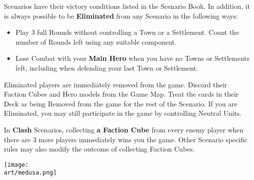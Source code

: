 
\begin{multicols*}{2}

 Scenarios have their victory conditions listed in the Scenario Book.
In addition, it is always possible to be \textbf{Eliminated} from any Scenario in the following ways:
\begin{itemize}
  \item Play 3 full Rounds without controlling a Town or a Settlement.
    Count the number of Rounds left using any suitable component.
  \item Lose Combat with your \textbf{Main Hero} when you have no Towns or Settlements left, including when defending your last Town or Settlement.
\end{itemize}
Eliminated players are immediately removed from the game.
Discard their Faction Cubes and Hero models from the Game Map.
Treat the cards in their Deck as being Removed from the game for the rest of the Scenario.
If you are Eliminated, you may still participate in the game by controlling Neutral Units.\par
{}\par

\columnbreak

In \textbf{Clash} Scenarios, collecting \textbf{a Faction Cube} from every enemy player when there are 3 more players immediately wins you the game.
Other Scenario specific rules may also modify the outcome of collecting Faction Cubes.

\vspace*{\fill}
\hspace{-6em}
\texttt{[image: \\art/medusa.png]}

\end{multicols*}

